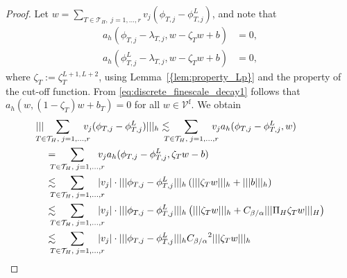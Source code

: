 \documentclass[10pt]{article}
\numberwithin{equation}{section}
\theoremstyle{plain}
\theoremstyle{definition}
\theoremstyle{remark}
\begin{document}
\begin{proof}
 Let $w = \sum_{T\in{\mathcal{T}}_H,\;j=1,\ldots,r}v_j(\phi_{T,j}-\phi^L_{T,j})$, and note that
  \begin{equation}\label{eq:discrete_finescale_decay1}
    \begin{aligned}
      {a_h({\phi_{T,j}-\lambda_{T,j}},{w-\zeta_Tw+b})} &= 0, \\
      {a_h({\phi^L_{T,j}-\lambda_{T,j}},{w-\zeta_Tw+b})} &= 0,
    \end{aligned}
  \end{equation}
  where $\zeta_{T}:=\zeta_T^{L+1,L+2}$, using {Lemma~\ref{{lem:property_Lp}}} and the property of the cut-off function.
  From \eqref{eq:discrete_finescale_decay1} follows that ${a_h({w},{(1-\zeta_T)w+b_{T}})}=0$ for all $w\in{\mathcal{V}^{\operatorname*{f}}}$.
  We obtain
  \begin{equation}\label{eq:decayfunc1}
    \begin{aligned}
      &{||| {\hspace{-2ex}\sum_{T\in{\mathcal{T}}_H,\;j=1,\ldots,r}\hspace{-2ex}v_j(\phi_{T,j}-\phi^L_{T,j})} |||_h} \lesssim \hspace{-2ex}\sum_{T\in{\mathcal{T}}_H,\;j=1,\ldots,r}\hspace{-2ex}v_j{a_h({\phi_{T,j}-\phi^L_{T,j}},{w})} \\
      &\quad = \hspace{-2ex}\sum_{T\in{\mathcal{T}}_H,\;j=1,\ldots,r}\hspace{-2ex}v_j{a_h({\phi_{T,j}-\phi^L_{T,j}},{\zeta_{T} w-b})} \\
      &\quad \lesssim \hspace{-2ex}\sum_{T\in{\mathcal{T}}_H,\;j=1,\ldots,r}\hspace{-2ex}|v_j|\cdot{||| {\phi_{T,j}-\phi^L_{T,j}} |||_h}\left({||| {\zeta_{T} w} |||_h}+{||| {b} |||_h}\right)\\
      &\quad \lesssim \hspace{-2ex}\sum_{T\in{\mathcal{T}}_H,\;j=1,\ldots,r}\hspace{-2ex}|v_j|\cdot{||| {\phi_{T,j}-\phi^L_{T,j}} |||_h}\left({||| {\zeta_{T} w} |||_h}+{C_{{\beta}/{\alpha}}}{||| {{\Pi_H} \zeta_{T}w} |||_H}\right)\\
      &\quad \lesssim \hspace{-2ex}\sum_{T\in{\mathcal{T}}_H,\;j=1,\ldots,r}\hspace{-2ex}|v_j|\cdot{||| {\phi_{T,j}-\phi^L_{T,j}} |||_h}{C_{{\beta}/{\alpha}}}^2{||| {\zeta_{T}w} |||_h}\\

\end{aligned}
\end{equation}
\end{proof}
\end{document}
